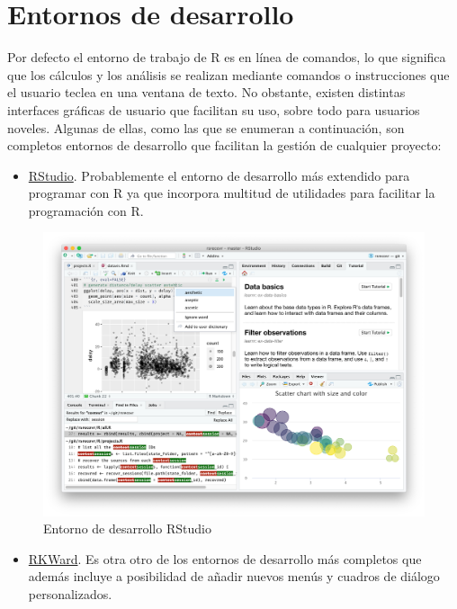 \documentclass[
  spanish,
  a4paper,
]{scrreport}
\providecommand{\tightlist}{%
  \setlength{\itemsep}{0pt}\setlength{\parskip}{0pt}}
\theoremstyle{definition}
\theoremstyle{remark}
\begin{document}
\section{Entornos de desarrollo}\label{entornos-de-desarrollo}

Por defecto el entorno de trabajo de R es en línea de comandos, lo que
significa que los cálculos y los análisis se realizan mediante comandos
o instrucciones que el usuario teclea en una ventana de texto. No
obstante, existen distintas interfaces gráficas de usuario que facilitan
su uso, sobre todo para usuarios noveles. Algunas de ellas, como las que
se enumeran a continuación, son completos entornos de desarrollo que
facilitan la gestión de cualquier proyecto:

\begin{itemize}
\tightlist
\item
  \href{https://www.rstudio.com/}{RStudio}. Probablemente el entorno de
  desarrollo más extendido para programar con R ya que incorpora
  multitud de utilidades para facilitar la programación con R.
\end{itemize}

\begin{figure}[H]

{\centering \includegraphics[width=8.33333in,height=\textheight,keepaspectratio]{img/rstudio.png}

}

\caption{Entorno de desarrollo RStudio}

\end{figure}%

\begin{itemize}
\tightlist
\item
  \href{https://rkward.kde.org}{RKWard}. Es otra otro de los entornos de
  desarrollo más completos que además incluye a posibilidad de añadir
  nuevos menús y cuadros de diálogo personalizados.
\end{itemize}
\end{document}
